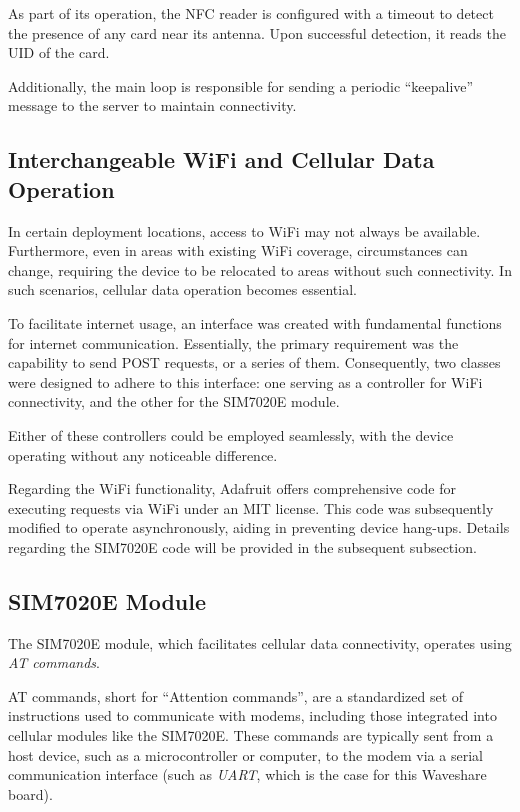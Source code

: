 As part of its operation, the NFC reader is configured with a timeout to detect the presence of any 
card near its antenna. Upon successful detection, it reads the UID of the card.

Additionally, the main loop is responsible for sending a periodic ``keepalive'' message to the 
server to maintain connectivity.

\subsection{Interchangeable WiFi and Cellular Data Operation}

In certain deployment locations, access to WiFi may not always be available. Furthermore, even in 
areas with existing WiFi coverage, circumstances can change, requiring the device to be relocated 
to areas without such connectivity. In such scenarios, cellular data operation becomes essential.

To facilitate internet usage, an interface was created with fundamental functions for internet 
communication. Essentially, the primary requirement was the capability to send POST requests, or a 
series of them. Consequently, two classes were designed to adhere to this interface: one serving as 
a controller for WiFi connectivity, and the other for the SIM7020E module.

Either of these controllers could be employed seamlessly, with the device operating without any 
noticeable difference.

Regarding the WiFi functionality, Adafruit offers comprehensive code for executing requests via 
WiFi under an MIT license. This code was subsequently modified to operate asynchronously, aiding in 
preventing device hang-ups. Details regarding the SIM7020E code will be provided in the subsequent 
subsection.


\subsection{SIM7020E Module}

The SIM7020E module, which facilitates cellular data connectivity, operates using 
\textit{AT commands}.

AT commands, short for ``Attention commands'', are a standardized set of instructions used to 
communicate with modems, including those integrated into cellular modules like the SIM7020E. These 
commands are typically sent from a host device, such as a microcontroller or computer, to the modem 
via a serial communication interface (such as \textit{UART}, which is the case for this Waveshare 
board).

